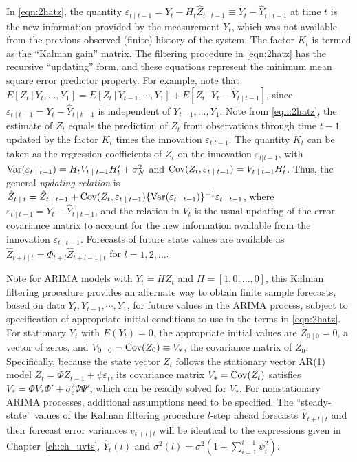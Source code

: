 In \eqref{eqn:2hatz}, the quantity $\varepsilon_{t \;|\; t-1}= Y_t - H_t \hat{Z}_{t \;|\; t-1} \equiv Y_t - \hat{Y}_{t \;|\; t-1}$ at time $t$ is the new information provided by the measurement $Y_t$, which was not available from the previous observed (finite) history of the system. The factor $K_t$ is termed as the ``Kalman gain'' matrix. The filtering procedure in \eqref{eqn:2hatz} has the recursive ``updating'' form, and these equations represent the minimum mean square error predictor property. For example, note that $E[Z_t \,|\,Y_t,\ldots,Y_1]= E[Z_t \,|\,Y_{t-1},\cdots,Y_1] + E[Z_t \,|\, Y_t - \hat{Y}_{t \;|\; t-1}]$, since $\varepsilon_{t \;|\; t-1} = Y_t - \hat{Y}_{t \;|\; t-1}$ is independent of $Y_{t-1}, \ldots, Y_1$. Note from \eqref{eqn:2hatz}, the estimate of $Z_t$ equals the prediction of $Z_t$ from observations through time $t-1$ updated by the factor $K_t$ times the innovation $\varepsilon_{t|t-1}$. The quantity $K_t$ can be taken as the regression coefficients of $Z_t$ on the innovation $\varepsilon_{t|t-1}$, with $\operatorname{Var}(\varepsilon_{t\;|\; t-1}) = H_t V_{t\;|\; t-1} H_t' + \sigma_N^2$ and $\operatorname{Cov}(Z_t,\varepsilon_{t\;|\; t-1})= V_{t \;|\; t-1} H_t'$. Thus, the general \emph{updating relation} is $\hat{Z}_{t\;|\;t} = \hat{Z}_{t\;|\; t-1} + \operatorname{Cov}(Z_t,\varepsilon_{t\;|\; t-1}) \{ \operatorname{Var}(\varepsilon_{t\;|\; t-1}) \}^{-1} \varepsilon_{t\;|\; t-1}$, where $\varepsilon_{t \;|\; t-1} = Y_t - \hat{Y}_{t\;|\; t-1}$, and the relation in $V_t$ is the usual updating of the error covariance matrix to account for the new information available from the innovation $\varepsilon_{t\;|\; t-1}$. Forecasts of future state values are available as $\hat{Z}_{t+l\;|\;t} = \Phi_{t+l} \hat{Z}_{t+l-1\;|\;t}$ for $l = 1,2,\ldots$. 


Note for ARIMA models with $Y_t = HZ_t$ and $H = [1,0,\ldots,0]$, this Kalman filtering procedure provides an alternate way to obtain finite sample forecasts, based on data $Y_t,Y_{t-1}, \cdots, Y_1$, for future values in the ARIMA process, subject to specification of appropriate initial conditions to use in the terms in \eqref{eqn:2hatz}. For stationary $Y_t$ with $E(Y_t)= 0$, the appropriate initial values are $\hat{Z}_{0 \;|\;0} = 0$, a vector of zeros, and $V_{0 \;|\;0} = \operatorname{Cov}(Z_0) \equiv V_*$, the covariance matrix of $Z_0$. Specifically, because the state vector $Z_t$ follows the stationary vector AR(1) model $Z_t = \Phi Z_{t-1} + \psi \varepsilon_t$, its covariance matrix $V_*= \operatorname{Cov}(Z_t)$ satisfies $V_*= \Phi V_* \Phi' + \sigma_{\varepsilon}^2 \Psi \Psi'$, which can be readily solved for $V_*$. For nonstationary ARIMA processes, additional assumptions need to be specified. The ``steady-state'' values of the Kalman filtering procedure $l$-step ahead forecasts $\hat{Y}_{t+l\;|\;t}$ and their forecast error variances $v_{t+l\;|\;t}$ will be identical to the expressions given in Chapter~\ref{ch:ch_uvts}, $\hat{Y}_t(l)$ and $\sigma^2(l) = \sigma^2 (1 + \sum_{i=1}^{i-1}\psi_{i}^2 )$. 


